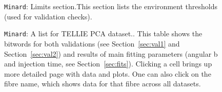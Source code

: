 \documentclass[12pt]{article}
\begin{document}
\begin{figure}
\centering
\noindent{}
  \caption{\centering \texttt{Minard}: Limits section.\hspace{\textwidth}This section lists the environment thresholds (used for validation checks).}
  \label{fig:min4}
\end{figure}

\begin{figure}
\centering
\noindent{}
  \caption{\centering \texttt{Minard}: A list for TELLIE PCA dataset.\hspace{\textwidth}. This table shows the bitwords for both validations (see Section~\ref{sec:val1} and Section~\ref{sec:val2}) and results of main fitting parameters (angular b and injection time, see Section~\ref{sec:fits}). Clicking a cell brings up more detailed page with data and plots. One can also click on the fibre name, which shows data for that fibre across all datasets.}
  \label{fig:min8}
\end{figure}
\end{document}
